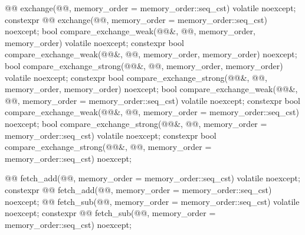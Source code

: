 \begin{codeblock}
{{    @@ exchange(@@,
                                 memory_order = memory_order::seq_cst) volatile noexcept;
    constexpr @@ exchange(@@,
                                 memory_order = memory_order::seq_cst) noexcept;
    bool compare_exchange_weak(@@&, @@,
                               memory_order, memory_order) volatile noexcept;
    constexpr bool compare_exchange_weak(@@&, @@,
                               memory_order, memory_order) noexcept;
    bool compare_exchange_strong(@@&, @@,
                                 memory_order, memory_order) volatile noexcept;
    constexpr bool compare_exchange_strong(@@&, @@,
                                 memory_order, memory_order) noexcept;
    bool compare_exchange_weak(@@&, @@,
                               memory_order = memory_order::seq_cst) volatile noexcept;
    constexpr bool compare_exchange_weak(@@&, @@,
                               memory_order = memory_order::seq_cst) noexcept;
    bool compare_exchange_strong(@@&, @@,
                                 memory_order = memory_order::seq_cst) volatile noexcept;
    constexpr bool compare_exchange_strong(@@&, @@,
                                 memory_order = memory_order::seq_cst) noexcept;

    @@ fetch_add(@@,
                                  memory_order = memory_order::seq_cst) volatile noexcept;
    constexpr @@ fetch_add(@@,
                                  memory_order = memory_order::seq_cst) noexcept;
    @@ fetch_sub(@@,
                                  memory_order = memory_order::seq_cst) volatile noexcept;
    constexpr @@ fetch_sub(@@,
                                  memory_order = memory_order::seq_cst) noexcept;

}}
\end{codeblock}
